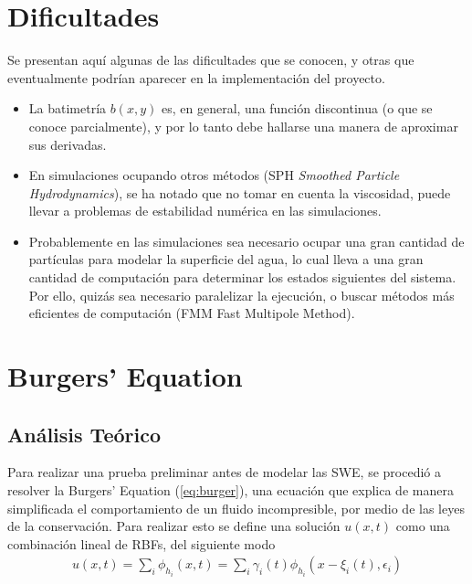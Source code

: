 ﻿\documentclass[spanish]{article}
\begin{document}
\section{Dificultades}
Se presentan aquí algunas de las dificultades que se conocen, y otras que eventualmente podrían aparecer en la implementación
del proyecto.
\begin{itemize}
    \item La batimetría $b(x,y)$ es, en general, una función discontinua (o que se conoce parcialmente), y por lo tanto
    debe hallarse una manera de aproximar sus derivadas.
    \item En simulaciones ocupando otros métodos (SPH \textit{Smoothed Particle Hydrodynamics}), se ha notado que no tomar
    en cuenta la viscosidad, puede llevar a problemas de estabilidad numérica en las simulaciones.
    \item Probablemente en las simulaciones sea necesario ocupar una gran cantidad de partículas para modelar la superficie
    del agua, lo cual lleva a una gran cantidad de computación para determinar los estados siguientes del sistema. Por ello,
    quizás sea necesario paralelizar la ejecución, o buscar métodos más eficientes de computación (FMM Fast Multipole
    Method).
\end{itemize}                                                                                                                                                                                                                                                                                                                                                                                                     
\newpage  
\section{Burgers' Equation}
  \subsection{Análisis Teórico}
    Para realizar una prueba preliminar antes de modelar las SWE, se procedió a resolver la Burgers' Equation (\ref{eq:burger}), una ecuación que explica de manera simplificada el comportamiento de un fluido incompresible, por medio de las leyes de la conservación. Para realizar esto se define una solución $u(x,t)$ como una combinación lineal de RBFs, del siguiente modo
    \begin{align}
      u(x,t) = \sum_{i} \phi_{h_i}(x,t) = \sum_i \gamma_i(t)\phi_{h_i}(x-\xi_i(t),\epsilon_i)
    \end{align}
    
\end{document}
